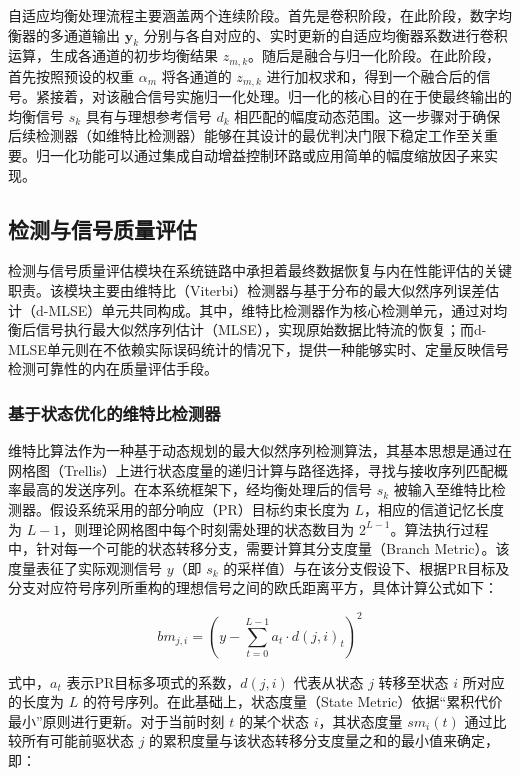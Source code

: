 自适应均衡处理流程主要涵盖两个连续阶段。首先是卷积阶段，在此阶段，数字均衡器的多通道输出 $\mathbf{y}_k$ 分别与各自对应的、实时更新的自适应均衡器系数进行卷积运算，生成各通道的初步均衡结果 $z_{m,k}$。随后是融合与归一化阶段。在此阶段，首先按照预设的权重 $\alpha_m$ 将各通道的 $z_{m,k}$ 进行加权求和，得到一个融合后的信号。紧接着，对该融合信号实施归一化处理。归一化的核心目的在于使最终输出的均衡信号 $s_k$ 具有与理想参考信号 $d_k$ 相匹配的幅度动态范围。这一步骤对于确保后续检测器（如维特比检测器）能够在其设计的最优判决门限下稳定工作至关重要。归一化功能可以通过集成自动增益控制环路或应用简单的幅度缩放因子来实现。


\subsection{检测与信号质量评估}

检测与信号质量评估模块在系统链路中承担着最终数据恢复与内在性能评估的关键职责。该模块主要由维特比（Viterbi）检测器与基于分布的最大似然序列误差估计（d-MLSE）单元共同构成。其中，维特比检测器作为核心检测单元，通过对均衡后信号执行最大似然序列估计（MLSE），实现原始数据比特流的恢复；而d-MLSE单元则在不依赖实际误码统计的情况下，提供一种能够实时、定量反映信号检测可靠性的内在质量评估手段。

\subsubsection{基于状态优化的维特比检测器}

维特比算法作为一种基于动态规划的最大似然序列检测算法，其基本思想是通过在网格图（Trellis）上进行状态度量的递归计算与路径选择，寻找与接收序列匹配概率最高的发送序列。在本系统框架下，经均衡处理后的信号 $s_k$ 被输入至维特比检测器。假设系统采用的部分响应（PR）目标约束长度为 $L$，相应的信道记忆长度为 $L-1$，则理论网格图中每个时刻需处理的状态数目为 $2^{L-1}$。算法执行过程中，针对每一个可能的状态转移分支，需要计算其分支度量（Branch Metric）。该度量表征了实际观测信号 $y$（即 $s_k$ 的采样值）与在该分支假设下、根据PR目标及分支对应符号序列所重构的理想信号之间的欧氏距离平方，具体计算公式如下：

\[
bm_{j,i} = \left( y - \sum_{t=0}^{L-1} a_t \cdot d(j,i)_t \right)^2
\]

式中，$a_t$ 表示PR目标多项式的系数，$d(j,i)$ 代表从状态 $j$ 转移至状态 $i$ 所对应的长度为 $L$ 的符号序列。在此基础上，状态度量（State Metric）依据“累积代价最小”原则进行更新。对于当前时刻 $t$ 的某个状态 $i$，其状态度量 $sm_i(t)$ 通过比较所有可能前驱状态 $j$ 的累积度量与该状态转移分支度量之和的最小值来确定，即：

